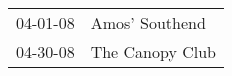 \begin{supertabular}{p{0.07\textwidth}p{0.23\textwidth}}
 04-01-08 &   Amos' Southend \\
 04-30-08 &  The Canopy Club \\
\end{supertabular}

